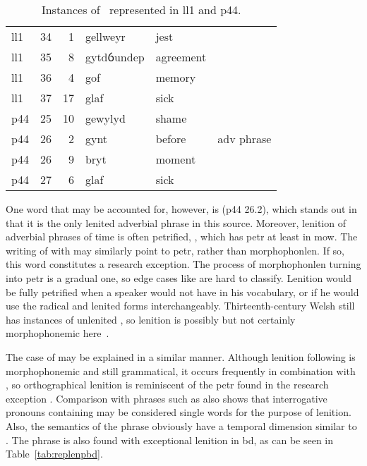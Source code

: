 \begin{table}[h]
  \centering
  \begin{tabular}{lddwql}
    \toprule
     &  &  &  &  &  \\
    \midrule
    \acrshort{ll1} & 34 & 1 & gellweyr & jest &  \\
    \acrshort{ll1} & 35 & 8 & gytdỽundep & agreement &  \\
    \acrshort{ll1} & 36 & 4 & gof & memory &  \\
    \acrshort{ll1} & 37 & 17 & glaf & sick &  \\
    \acrshort{p44} & 25 & 10 & gewylyd & shame &  \\
    \acrshort{p44} & 26 & 2 & gynt & before & adv phrase \\
    \acrshort{p44} & 26 & 9 & bryt & moment &  \\
    \acrshort{p44} & 27 & 6 & glaf & sick &  \\
    \bottomrule
  \end{tabular}%
  \caption{Instances of \lT\ represented in \acrshort{ll1} and \acrshort{p44}.}
  \label{tab:ltrepll1p44}
\end{table}

One word that may be accounted for, however, is  (\gls{p44} 26.2), which stands out in that it is the only lenited adverbial phrase in this source.
Moreover, lenition of adverbial phrases of time is often petrified, \eg {}, which has \gls{petr} at least in \gls{mow}.
The writing of  with  may similarly point to \gls{petr}, rather than \gls{morphophonlen}.
If so, this word constitutes a research exception. The process of \gls{morphophonlen} turning into \gls{petr} is a gradual one, so edge cases like  are hard to classify. Lenition would be fully petrified when a speaker would not have  in his vocabulary, or if he would use the radical and lenited forms interchangeably. Thirteenth-century Welsh still has instances of unlenited , so lenition is possibly but not certainly morphophonemic here~\autocite[s.v.~]{bevan_geiriadur_2014}.

The case of  may be explained in a similar manner.
Although lenition following  is morphophonemic and still grammatical, it occurs frequently in combination with , so orthographical lenition is reminiscent of the \gls{petr} found in the research exception .
Comparison with phrases  such as  also shows that interrogative pronouns containing  may be considered single words for the purpose of lenition.
Also, the semantics of the phrase obviously have a temporal dimension similar to .
The phrase  is also found with exceptional lenition in \gls{bd}, as can be seen in Table~\ref{tab:replenpbd}.

